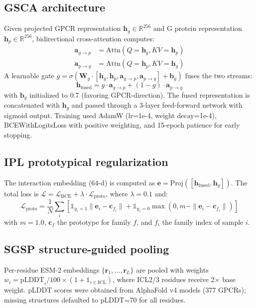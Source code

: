 \documentclass[unnumsec,webpdf,contemporary,large,numbered]{oup-authoring-template}
\begin{document}
\subsection{GSCA architecture}
Given projected GPCR representation $\mathbf{h}_g \in \mathbb{R}^{256}$ and G protein representation $\mathbf{h}_p \in \mathbb{R}^{256}$, bidirectional cross-attention computes:
\begin{align*}
\mathbf{a}_{g\rightarrow p} &= \text{Attn}(Q=\mathbf{h}_g, KV=\mathbf{h}_p) \\
\mathbf{a}_{p\rightarrow g} &= \text{Attn}(Q=\mathbf{h}_p, KV=\mathbf{h}_g)
\end{align*}
A learnable gate $g = \sigma(\mathbf{W}_g \cdot [\mathbf{h}_g, \mathbf{h}_p, \mathbf{a}_{g\rightarrow p}, \mathbf{a}_{p\rightarrow g}] + \mathbf{b}_g)$ fuses the two streams:
\begin{equation*}
\mathbf{h}_{\text{fused}} = g \cdot \mathbf{a}_{g\rightarrow p} + (1-g) \cdot \mathbf{a}_{p\rightarrow g}
\end{equation*}
with $\mathbf{b}_g$ initialized to 0.7 (favoring GPCR-direction). The fused representation is concatenated with $\mathbf{h}_g$ and passed through a 3-layer feed-forward network with sigmoid output. Training used AdamW (lr=1e-4, weight decay=1e-4), BCEWithLogitsLoss with positive weighting, and 15-epoch patience for early stopping.

\subsection{IPL prototypical regularization}
The interaction embedding (64-d) is computed as $\mathbf{e} = \text{Proj}([\mathbf{h}_{\text{fused}}, \mathbf{h}_g])$. The total loss is $\mathcal{L} = \mathcal{L}_{\text{BCE}} + \lambda \cdot \mathcal{L}_{\text{proto}}$, where $\lambda=0.1$ and:
\begin{equation*}
\mathcal{L}_{\text{proto}} = \frac{1}{N}\sum_{i} \left[ \mathbb{1}_{y_i=1}\|\mathbf{e}_i - \mathbf{c}_{f_i}\| + \mathbb{1}_{y_i=0}\max(0, m - \|\mathbf{e}_i - \mathbf{c}_{f_i}\|) \right]
\end{equation*}
with $m=1.0$, $\mathbf{c}_f$ the prototype for family $f$, and $f_i$ the family index of sample $i$.

\subsection{SGSP structure-guided pooling}
Per-residue ESM-2 embeddings $\{\mathbf{r}_1, \ldots, \mathbf{r}_L\}$ are pooled with weights $w_i = \text{pLDDT}_i / 100 \times (1 + \mathbb{1}_{i\in\text{ICL}})$, where ICL2/3 residues receive 2$\times$ base weight. pLDDT scores were obtained from AlphaFold v4 models (377 GPCRs); missing structures defaulted to pLDDT=70 for all residues.
\end{document}
